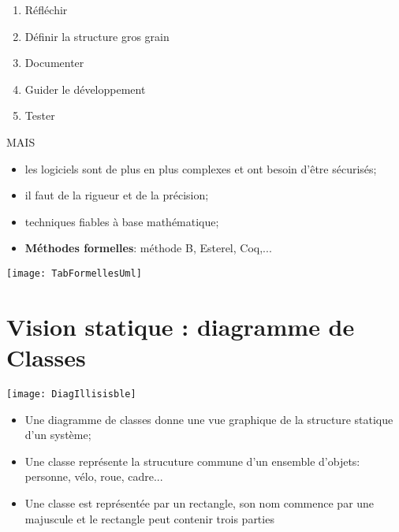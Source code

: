 \documentclass[french]{beamer}
\begin{document}
\begin{frame}
  \begin{enumerate}
  \item Réfléchir
  \item Définir la structure \og gros grain\fg{}
  \item Documenter
  \item Guider le développement
  \item Tester
  \end{enumerate}
\end{frame}


\begin{frame}
  MAIS
 \begin{itemize}
  \item  les logiciels  sont  de plus  en  plus complexes  et  ont besoin  d'être
    sécurisés;
  \item il faut de la rigueur et de la précision;
    \item techniques fiables à base mathématique;
  \item \textbf{Méthodes formelles}: méthode B, Esterel, Coq,...
  \end{itemize}
\end{frame}


\begin{frame}
  
\begin{center}
  \texttt{[image: TabFormellesUml]}
\end{center}

\end{frame}


\section{Vision statique : diagramme de Classes}


\begin{frame}
  
\begin{center}
  \texttt{[image: DiagIllisisble]}
\end{center}

\end{frame}


\begin{frame}
  
 \begin{itemize}\frametitle{Classes}
  \item  Une diagramme de classes donne une vue graphique de la structure statique d'un
    système;
    \item Une  classe représente  la strucuture  commune d'un  ensemble d'objets:
      personne, vélo, roue, cadre...
      \item Une  classe est représentée par  un rectangle, son nom  commence par
        une majuscule et le rectangle peut contenir trois parties
      \end{itemize}
    \end{frame}
\end{document}
